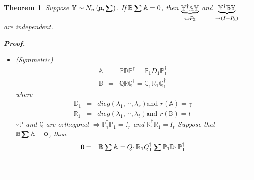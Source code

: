 \documentclass{article}
\newtheorem{theorem}{Theorem}
\newenvironment{proof}[1][Proof]{\noindent\textbf{#1.} }{\ \rule{0.5em}{0.5em}}
\begin{document}
\begin{theorem}
Suppose $\mathbb{Y}\sim N_{n}\left( \mathbb{%
\mu\mkern-12.3mu\mu%
},%
\tsum\mkern-20mu\tsum%
\right) $. If $\mathbb{B}%
\tsum\mkern-20mu\tsum%
\mathbb{A}=0$, then $\underset{\Leftrightarrow P_{\mathbb{X}}}{\underbrace{%
\mathbb{Y}^{\dagger }\mathbb{AY}}}$ and $\underset{\rightarrow \left( I-P_{%
\mathbb{X}}\right) }{\underbrace{\mathbb{Y}^{\dagger }\mathbb{BY}}}$ are
independent.

\begin{proof}

\begin{itemize}
\item[Case 1] (Symmetric)%
\begin{eqnarray*}
\mathbb{A} &=&\mathbb{PDP}^{\dagger }=\mathbb{P}_{1}D_{1}\mathbb{P}%
_{1}^{\dagger } \\
\mathbb{B} &=&\mathbb{QRQ}^{\dagger }=\mathbb{Q}_{1}\mathbb{R}_{1}\mathbb{Q}%
_{1}^{\dagger }
\end{eqnarray*}%
where%
\begin{eqnarray*}
\mathbb{D}_{1} &=&diag\left( \lambda _{1},\cdots ,\lambda _{r}\right) \text{
and }r\left( \mathbb{A}\right) =\gamma  \\
\mathbb{R}_{1} &=&diag\left( \lambda _{1},\cdots ,\lambda _{t}\right) \text{
and }r\left( \mathbb{B}\right) =t
\end{eqnarray*}%
$\because \mathbb{P}$ and $\mathbb{Q}$ are orthogonal\newline
\newline
$\Rightarrow \mathbb{P}_{1}^{\dagger }\mathbb{P}_{1}=I_{r}$ and $\mathbb{R}%
_{1}^{\dagger }\mathbb{R}_{1}=I_{t}$\newline
\newline
Suppose that $\mathbb{B}%
\tsum\mkern-20mu\tsum%
\mathbb{A}=\boldsymbol{0}$, then%
\begin{eqnarray*}
\boldsymbol{0} &=&\mathbb{B}%
\tsum\mkern-20mu\tsum%
\mathbb{A}=Q_{1}\mathbb{R}_{1}Q_{1}^{\dagger }%
\tsum\mkern-20mu\tsum%
\mathbb{P}_{1}\mathbb{D}_{1}\mathbb{P}_{1}^{\dagger } \\

\end{eqnarray*}
\end{itemize}
\end{proof}
\end{theorem}
\end{document}
